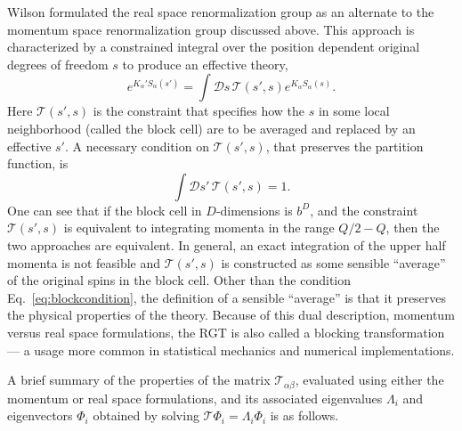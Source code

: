 Wilson formulated the real space renormalization group as an alternate
to the momentum space renormalization group discussed above.  This
approach is characterized by a constrained integral over the position
dependent original degrees of freedom $s$ to produce an effective
theory,
\begin{equation}
e^{K_\alpha'S_\alpha(s')} = \int \mathcal{D}s\,\mathcal{T}(s',s)
    e^{K_\alpha S_\alpha(s)}.
\end{equation}
Here $\mathcal{T}(s',s)$ is the constraint that specifies how the $s$
in some local neighborhood (called the block cell) are to be averaged
and replaced by an effective $s'$.  A necessary condition on
$\mathcal{T}(s',s)$, that preserves the partition function, is
\begin{equation}
\int \mathcal{D}s'\,\mathcal{T}(s',s) = 1.
\label{eq:blockcondition}
\end{equation}
One can see that if the block cell in $D$-dimensions is $b^D$, and the
constraint $\mathcal{T}(s',s)$ is equivalent to integrating momenta in
the range $Q/2 - Q$, then the two approaches are equivalent.  In
general, an exact integration of the upper half momenta is not feasible
and $\mathcal{T}(s',s)$ is constructed as some sensible ``average'' of
the original spins in the block cell.  Other than the condition
Eq.~\ref{eq:blockcondition}, the definition of a sensible ``average''
is that it preserves the physical properties of the theory.  Because of
this dual description, momentum versus real space formulations, the RGT
is also called a blocking transformation --- a usage more common in
statistical mechanics and numerical implementations.

A brief summary of the properties of the matrix
$\mathcal{T}_{\alpha\beta}$, evaluated using either the momentum or
real space formulations, and its associated eigenvalues $\Lambda_i$ and
eigenvectors $\Phi_i$ obtained by solving $\mathcal{T}\Phi_i =
\Lambda_i\Phi_i$ is as follows.

